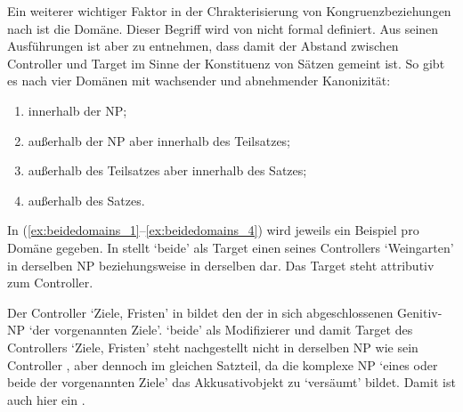 \label{phsec:domain}

Ein weiterer wichtiger Faktor in der Chrakterisierung von
Kongruenzbeziehungen nach \citet{corbett2006} ist die
Domäne. Dieser Begriff wird von \citet{corbett2006} nicht formal definiert. Aus
seinen Ausführungen ist aber zu entnehmen, dass damit der Abstand zwischen
Controller und Target im Sinne der Konstituenz von Sätzen gemeint ist. So gibt
es nach \citet[54]{corbett2006} vier Domänen mit wachsender  und
abnehmender Kanonizität:

\begin{enumerate}[noitemsep]
	\item innerhalb der NP;
	\item außerhalb der NP aber innerhalb des Teilsatzes;
	\item außerhalb des Teilsatzes aber innerhalb des Satzes;
	\item außerhalb des Satzes.
\end{enumerate}

In (\ref{ex:beidedomains_1}--\ref{ex:beidedomains_4}) wird jeweils ein Beispiel
pro Domäne gegeben. In  stellt  `beide' als
Target einen  seines Controllers  `Weingarten'
in derselben NP beziehungsweise in derselben
 dar. Das Target steht attributiv zum
Controller.


Der Controller  `Ziele, Fristen' in  bildet den
 der in sich abgeschlossenen Genitiv-NP
 `der vorgenannten Ziele'.
 `beide' als Modifizierer und damit Target des
Controllers  `Ziele, Fristen' steht nachgestellt nicht in derselben NP
wie sein Controller , aber dennoch im gleichen Satzteil, da die
komplexe NP  `eines oder beide
der vorgenannten Ziele' das Akkusativobjekt zu  `versäumt'
bildet. Damit ist  auch hier ein .

